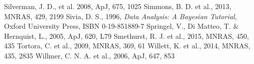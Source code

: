 \documentclass[useAMS,usenatbib]{mn2e}
\begin{document}
\begin{thebibliography}{}
 Silverman, J. D., et al. 2008, ApJ, 675, 1025
 Simmons, B. D. et al., 2013, MNRAS, 429, 2199
 Sivia, D. S., 1996, \emph{Data Analysis: A Bayesian Tutorial}, Oxford University Press, ISBN 0-19-851889-7
 Springel, V., Di Matteo, T. \& Hernquist, L., 2005, ApJ, 620, L79
 Smethurst, R. J. et al., 2015, MNRAS, 450, 435
 Tortora, C. et al., 2009, MNRAS, 369, 61
 Willett, K. et al., 2014, MNRAS, 435, 2835
 Willmer, C. N. A. et al., 2006, ApJ, 647, 853
\end{thebibliography}
\end{document}
